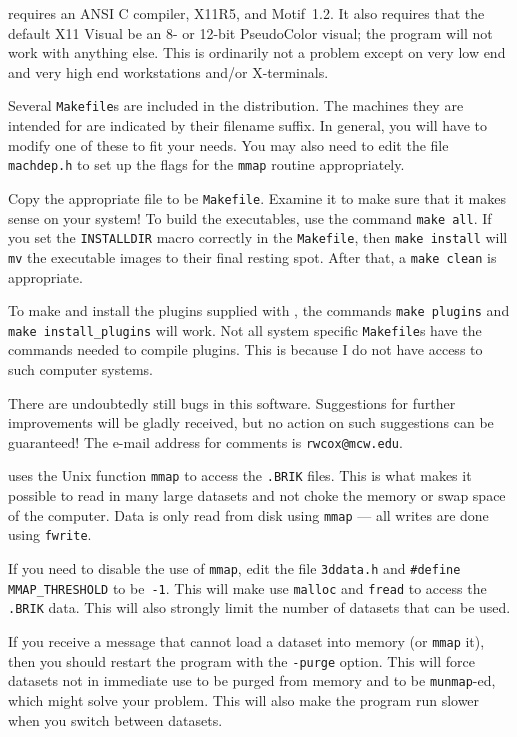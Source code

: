 \afnit requires an ANSI C compiler, X11R5, and Motif~1.2.
It also requires that the default X11 Visual be an 8-
or 12-bit PseudoColor visual;  the program will not work with anything
else.  This is ordinarily not a problem except on very low end and
very high end workstations and/or X-terminals.

Several {\tt Makefile}s are included in the distribution.
The machines they are intended for are indicated by their filename suffix.
In general, you will have to modify one of these to fit your needs.
You may also need to edit the file
{\tt machdep.h} to set up the flags for the {\tt mmap} routine appropriately.

Copy the appropriate file to be {\tt Makefile}.  Examine it
to make sure that it makes sense on your system!
To build the executables, use the command {\tt make~all}.
If you set the {\tt INSTALLDIR} macro correctly in the {\tt Makefile},
then {\tt make~install} will {\tt mv} the executable images to their
final resting spot.
After that, a {\tt make~clean} is appropriate.

To make and install the plugins supplied with \afni, the
commands {\tt make~plugins} and {\tt make~install\_plugins}
will work.  Not all system specific {\tt Makefile}s have
the commands needed to compile plugins.  This is because I do
not have access to such computer systems.

There are undoubtedly still bugs in this software.
Suggestions for further improvements will be gladly received,
but no action on such suggestions can be guaranteed!
The e-mail address for \afnit comments is {\tt rwcox@mcw.edu}.

\afnit uses the Unix function {\tt mmap} to access the {\tt .BRIK} files.
This is what makes it possible to read in many large datasets and
not choke the memory or swap space of the computer.  Data is only read
from disk using {\tt mmap} --- all writes are done using {\tt fwrite}.

If you need to disable the use of {\tt mmap}, edit the file
{\tt 3ddata.h} and {\tt \#define} {\tt MMAP\_THRESHOLD} to be~{\tt -1}.
This will make \afnit use {\tt malloc} and {\tt fread} to
access the {\tt .BRIK} data.  This will also strongly limit the number
of datasets that can be used.

If you receive a message that \afnit cannot load a dataset into memory
(or {\tt mmap} it),
then you should restart the program with the {\tt -purge} option.
This will force datasets not in immediate use to be purged from memory
and to be {\tt munmap}-ed, which might solve your problem.
This will also make the program run slower when you switch between datasets.

